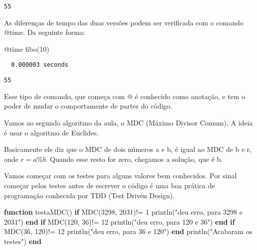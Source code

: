 \documentclass[
  letterpaper,
  DIV=11,
  numbers=noendperiod]{scrreprt}
\newenvironment{Shaded}{\begin{snugshade}}{\end{snugshade}}
\newcommand{\ControlFlowTok}[1]{\textcolor[rgb]{0.00,0.23,0.31}{\textbf{#1}}}
\newcommand{\FloatTok}[1]{\textcolor[rgb]{0.68,0.00,0.00}{#1}}
\newcommand{\FunctionTok}[1]{\textcolor[rgb]{0.28,0.35,0.67}{#1}}
\newcommand{\KeywordTok}[1]{\textcolor[rgb]{0.00,0.23,0.31}{\textbf{#1}}}
\newcommand{\NormalTok}[1]{\textcolor[rgb]{0.00,0.23,0.31}{#1}}
\newcommand{\OperatorTok}[1]{\textcolor[rgb]{0.37,0.37,0.37}{#1}}
\newcommand{\PreprocessorTok}[1]{\textcolor[rgb]{0.68,0.00,0.00}{#1}}
\newcommand{\StringTok}[1]{\textcolor[rgb]{0.13,0.47,0.30}{#1}}
\begin{document}
\begin{verbatim}
55
\end{verbatim}

As diferenças de tempo das duas versões podem ser verificada com o
comando @time. Da seguinte forma:

\begin{Shaded}
\begin{Highlighting}[]
\PreprocessorTok{@time} \FunctionTok{fibo}\NormalTok{(}\FloatTok{10}\NormalTok{)}
\end{Highlighting}
\end{Shaded}

\begin{verbatim}
  0.000003 seconds
\end{verbatim}

\begin{verbatim}
55
\end{verbatim}

Esse tipo de comando, que começa com @ é conhecido como anotação, e tem
o poder de mudar o comportamente de partes do código.

Vamos ao segundo algoritmo da aula, o MDC (Máximo Divisor Comum). A
ideia é usar o algoritmo de Euclides.

Basicamente ele diz que o MDC de dois números a e b, é igual ao MDC de b
e r, onde \(r=a\% b\). Quando esse resto for zero, chegamos a solução,
que é b.

Vamos começar com os testes para alguns valores bem conhecidos. Por
sinal começar pelos testes antes de escrever o código é uma boa prática
de programação conhecida por TDD (Test Driven Design).

\begin{Shaded}
\begin{Highlighting}[]
\KeywordTok{function} \FunctionTok{testaMDC}\NormalTok{()}
    \ControlFlowTok{if} \FunctionTok{MDC}\NormalTok{(}\FloatTok{3298}\NormalTok{, }\FloatTok{2031}\NormalTok{)}\OperatorTok{!=} \FloatTok{1}
        \FunctionTok{println}\NormalTok{(}\StringTok{"deu erro, para 3298 e 2031"}\NormalTok{)}
    \ControlFlowTok{end}
    \ControlFlowTok{if} \FunctionTok{MDC}\NormalTok{(}\FloatTok{120}\NormalTok{, }\FloatTok{36}\NormalTok{)}\OperatorTok{!=} \FloatTok{12}
        \FunctionTok{println}\NormalTok{(}\StringTok{"deu erro, para 120 e 36"}\NormalTok{)}
    \ControlFlowTok{end}
    \ControlFlowTok{if} \FunctionTok{MDC}\NormalTok{(}\FloatTok{36}\NormalTok{, }\FloatTok{120}\NormalTok{)}\OperatorTok{!=} \FloatTok{12}
        \FunctionTok{println}\NormalTok{(}\StringTok{"deu erro, para 36 e 120"}\NormalTok{)}
    \ControlFlowTok{end}
    \FunctionTok{println}\NormalTok{(}\StringTok{"Acabaram os testes"}\NormalTok{)}
\KeywordTok{end}
\end{Highlighting}
\end{Shaded}
\end{document}

